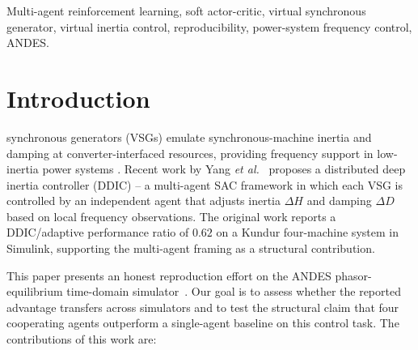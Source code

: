 \documentclass[journal,onecolumn,11pt]{IEEEtran}
\begin{document}
\begin{IEEEkeywords}
Multi-agent reinforcement learning, soft actor-critic, virtual
synchronous generator, virtual inertia control, reproducibility,
power-system frequency control, ANDES.
\end{IEEEkeywords}

\section{Introduction}\label{sec:intro}

 synchronous generators (VSGs) emulate
synchronous-machine inertia and damping at converter-interfaced
resources, providing frequency support in low-inertia power systems
\cite{zhong2011vsg,beck2007vsg}. Recent work by
Yang \emph{et al.}~\cite{yang2023ddic} proposes a distributed deep
inertia controller (DDIC) -- a multi-agent SAC framework
\cite{haarnoja2018sac} in which each VSG is controlled by an
independent agent that adjusts inertia $\Delta H$ and damping $\Delta D$
based on local frequency observations. The original work reports a
DDIC/adaptive performance ratio of $0.62$ on a Kundur four-machine
system in Simulink, supporting the multi-agent framing as a structural
contribution.

This paper presents an honest reproduction effort on the ANDES
phasor-equilibrium time-domain simulator~\cite{cui2021andes}. Our goal is
to assess whether the reported advantage transfers across simulators
and to test the structural claim that four cooperating agents
outperform a single-agent baseline on this control task. The
contributions of this work are:
\end{document}
